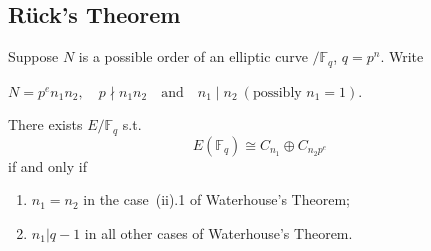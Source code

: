 \documentclass[10pt,handout]{beamer} %
\newcommand{\F}{\mathbb F}
\theoremstyle{definition}
\begin{document}
\subsection{R\"uck's Theorem}
\begin{frame}
\begin{theorem}[R\"uck]
Suppose $N$ is a possible order of an elliptic curve $/\F_q$,  $q=p^n$.  Write

\centerline{
$N = p^e n_1 n_2,\quad p\nmid n_1 n_2\quad\text{and}\quad n_1\mid n_2\ (\text{possibly }n_1 = 1).$}

There exists $E/\F_q$ s.t.
$$E(\F_q)\cong C_{n_1}\oplus C_{n_2p^e}$$
if and only if
\begin{enumerate}[<+-| alert@+>]
\item $n_1 = n_2$ in the case~(ii).1 of Waterhouse's Theorem;
\item $n_1 |q - 1$ in all other cases of  Waterhouse's Theorem.
\end{enumerate}
\end{theorem}\pause

\begin{example}
\end{example}
\end{frame}
\end{document}
